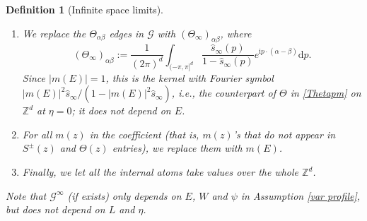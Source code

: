 \documentclass{article}
\newcommand{\1}{\mathds{1}}
\numberwithin{equation}{section}
\newcommand{\al}{\alpha}
\newcommand{\be}{\begin{equation}}
\newcommand{\ee}{\end{equation}}
\renewcommand{\cal}{\mathcal}
\newcommand{\wh}{\widehat}
\newcommand{\wt}{\widetilde}
\newcommand{\ii}{\mathrm{i}} %
\newcommand{\dd}{\mathrm{d}}
\renewcommand{\leq}{\leqslant}
\renewcommand{\le}{\leq}
\newcommand{\Z}{\mathbb{Z}}
\theoremstyle{plain} %
\newtheorem{definition}[theorem]{Definition}
\theoremstyle{remark}
\newcommand{\wtSinfty}{\wt\Sigma^{\infty}}
\newcommand{\Sele}{{\mathcal E}}
\begin{document}
\begin{definition}[Infinite space limits]
\begin{enumerate}
\item We replace the $\Theta_{\al\beta}$ edges in $\cal G $ with $(\Theta_\infty)_{\al\beta}$, where   %
\be\label{defwhtheta}
(\Theta_\infty)_{\al\beta}:=\frac{1}{(2\pi)^d}\int_{(-\pi,\pi]^d}\frac{\wh s_\infty(p)}{1-\wh s_\infty(p)}e^{\ii p\cdot (\al-\beta)}\dd p. \ee
Since $|m(E)|=1$, this is the kernel with Fourier symbol $|m(E)|^2\wh s_\infty/(1-|m(E)|^2\wh s_\infty)$, i.e., the counterpart of $\Theta$ in \eqref{Thetapm} on $\Z^d$ at $\eta=0$; it does not depend on $E$.


\item For all $m(z)$ in the coefficient (that is, $m(z)$'s that do not appear in $ S^{\pm}(z)$ and $\Theta(z)$ entries), we replace them with $m(E)$.


\item Finally, we let all the internal atoms take values over the whole $\Z^d$. 
\end{enumerate}
Note that $\cal G^\infty$ (if exists) only depends on $E$, $W$ and $\psi$ in Assumption \ref{var profile}, but does not depend on $L$ and $\eta$. %


\end{definition}
\end{document}
